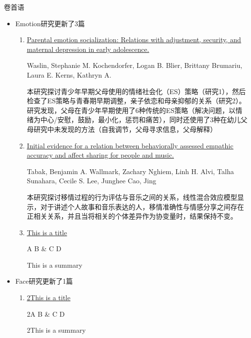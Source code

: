 \documentclass{eclab-beamer}
\begin{document}
\begin{frame}[allowframebreaks]{\sffamily 卷首语}

\begin{itemize}

\item Emotion研究更新了3篇
\begin{enumerate}
\item \href{https://doi.org/10.1037/emo0001099}{\color{blue} \ul{Parental emotion socialization: Relations with adjustment, security, and maternal depression in early adolescence.}}

\footnotesize{Waslin, Stephanie M. Kochendorfer, Logan B. Blier, Brittany Brumariu, Laura E. Kerns, Kathryn A.}

本研究探讨青少年早期父母使用的情绪社会化（ES）策略（研究1），然后检查了ES策略与青春期早期调整，亲子依恋和母亲抑郁的关系（研究2）。研究发现，父母在青少年早期使用了6种传统的ES策略（解决问题，以情绪为中心/安慰，鼓励，最小化，惩罚和痛苦），同时还使用了3种在幼儿父母研究中未发现的方法（自我调节，父母寻求信息，父母解释）
\item \href{https://doi.org/10.1037/emo0001094}{\color{blue} \ul{Initial evidence for a relation between behaviorally assessed empathic accuracy and affect sharing for people and music.}}

\footnotesize{Tabak, Benjamin A. Wallmark, Zachary Nghiem, Linh H. Alvi, Talha Sunahara, Cecile S. Lee, Junghee Cao, Jing}

本研究探讨移情过程的行为评估与音乐之间的关系，线性混合效应模型显示，对于讲述个人故事和音乐表达的人，移情准确性与情感分享之间存在正相关关系，并且当将相关的个体差异作为协变量时，结果保持不变。
\item \href{https://doi.org/example}{\color{blue} \ul{This is a title}}

\footnotesize{A B \& C D}

This is a summary
\end{enumerate}
\item Face研究更新了1篇
\begin{enumerate}
\item \href{https://doi.org/example2}{\color{blue} \ul{2This is a title}}

\footnotesize{2A B \& C D}

2This is a summary
\end{enumerate}

\end{itemize}
\end{frame}
\end{document}
